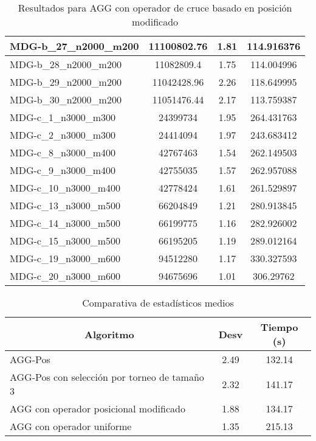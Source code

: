 \documentclass[10pt,a4paper]{article}
\begin{document}
\begin{table}[H]
\begin{center}
\begin{tabular}{|l|c|c|c|}
					MDG-b\_27\_n2000\_m200 & 11100802.76 & 1.81 & 114.916376 \\ \hline
					MDG-b\_28\_n2000\_m200 & 11082809.4 & 1.75 & 114.004996 \\ \hline
					MDG-b\_29\_n2000\_m200 & 11042428.96 & 2.26 & 118.649995 \\ \hline
					MDG-b\_30\_n2000\_m200 & 11051476.44 & 2.17 & 113.759387 \\ \hline
					MDG-c\_1\_n3000\_m300 & 24399734 & 1.95 & 264.431763 \\ \hline
					MDG-c\_2\_n3000\_m300 & 24414094 & 1.97 & 243.683412 \\ \hline
					MDG-c\_8\_n3000\_m400 & 42767463 & 1.54 & 262.149503 \\ \hline
					MDG-c\_9\_n3000\_m400 & 42755035 & 1.57 & 262.957088 \\ \hline
					MDG-c\_10\_n3000\_m400 & 42778424 & 1.61 & 261.529897 \\ \hline
					MDG-c\_13\_n3000\_m500 & 66204849 & 1.21 & 280.913845 \\ \hline
					MDG-c\_14\_n3000\_m500 & 66199775 & 1.16 & 282.926002 \\ \hline
					MDG-c\_15\_n3000\_m500 & 66195205 & 1.19 & 289.012164 \\ \hline
					MDG-c\_19\_n3000\_m600 & 94512280 & 1.17 & 330.327593 \\ \hline
					MDG-c\_20\_n3000\_m600 & 94675696 & 1.01 & 306.29762 \\ \hline
				\end{tabular}
				\caption{Resultados para AGG con operador de cruce basado en posición modificado}
				\label{}
				\end{center}
			\end{table}
			
\begin{table}[H]
	\begin{center}
		\begin{tabular}{|l|c|c|}
			\hline
			\multicolumn{1}{|c|}{\textbf{Algoritmo}} & \textbf{Desv} & \textbf{Tiempo (s)} \\ \hline
			AGG-Pos & 2.49 & 132.14 \\ \hline
			AGG-Pos con selección por torneo de tamaño 3 & 2.32 & 141.17 \\ \hline
			AGG con operador posicional modificado & 1.88 & 134.17 \\ \hline
			AGG con operador uniforme & 1.35 & 215.13 \\ \hline
		\end{tabular}
	\end{center}
	\caption{Comparativa de estadísticos medios}
	\label{}
\end{table}
\end{document}
